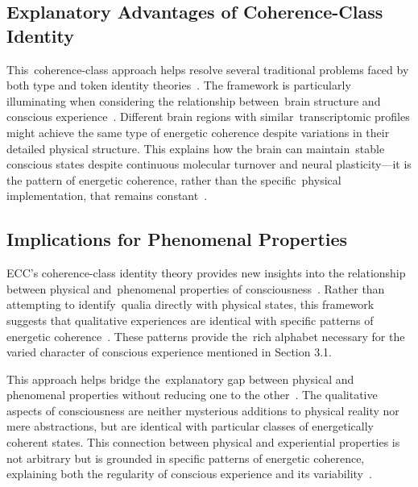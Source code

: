 \subsection*{Explanatory Advantages of Coherence-Class Identity}

This~coherence-class approach helps resolve several traditional problems faced by both type and token identity theories~\cite{lewis1966argument,bennett2007mental}. The framework is particularly illuminating when considering the relationship between~brain structure and conscious experience~\cite{block1972what,dehaene2011experimental}. Different brain regions with similar~transcriptomic profiles might achieve the same type of energetic coherence despite variations in their detailed physical structure. This explains how the brain can maintain~stable conscious states despite continuous molecular turnover and neural plasticity—it is the pattern of energetic coherence, rather than the specific~physical implementation, that remains constant~\cite{polger2009evaluating,pinotsis2023vivo}.

\subsection*{Implications for Phenomenal Properties}

ECC's coherence-class identity theory provides new insights into the relationship between physical and~phenomenal properties of consciousness~\cite{chalmers2006strong}. Rather than attempting to identify~qualia directly with physical states, this framework suggests that qualitative experiences are identical with specific patterns of energetic coherence~\cite{varela1996neurophenomenology}. These patterns provide the~rich alphabet necessary for the varied character of conscious experience mentioned in Section 3.1.

This approach helps bridge the~explanatory gap between physical and phenomenal properties without reducing one to the other~\cite{lewis1966argument,chalmers1997conscious}. The qualitative aspects of consciousness are neither mysterious additions to physical reality nor mere abstractions, but are identical with particular classes of energetically coherent states. This connection between physical and experiential properties is not arbitrary but is grounded in specific patterns of energetic coherence, explaining both the regularity of conscious experience and its variability~\cite{richardson2008multiple,bosl2025dynamical}.

